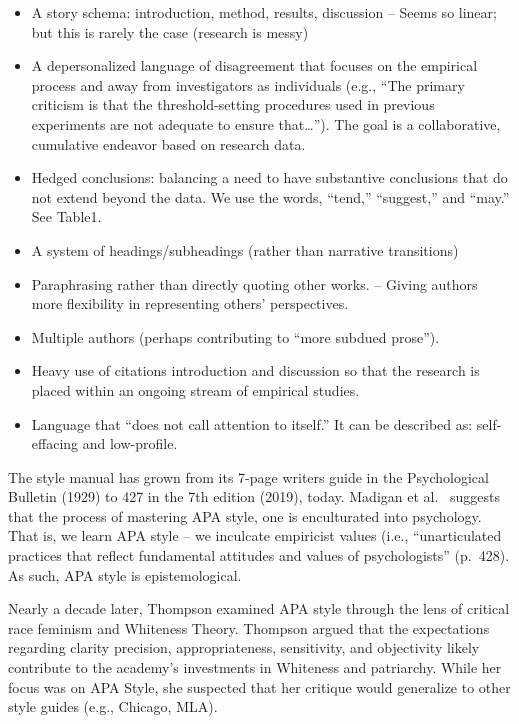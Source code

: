\documentclass[
  english,
]{book}
\providecommand{\tightlist}{%
  \setlength{\itemsep}{0pt}\setlength{\parskip}{0pt}}
\begin{document}
\begin{itemize}
\tightlist
\item
  A story schema: introduction, method, results, discussion
  -- Seems so linear; but this is rarely the case (research is messy)
\item
  A depersonalized language of disagreement that focuses on the empirical process and away from investigators as individuals (e.g., ``The primary criticism is that the threshold-setting procedures used in previous experiments are not adequate to ensure that\ldots{}''). The goal is a collaborative, cumulative endeavor based on research data.
\item
  Hedged conclusions: balancing a need to have substantive conclusions that do not extend beyond the data. We use the words, ``tend,'' ``suggest,'' and ``may.'' See Table1.
\item
  A system of headings/subheadings (rather than narrative transitions)
\item
  Paraphrasing rather than directly quoting other works.
  -- Giving authors more flexibility in representing others' perspectives.
\item
  Multiple authors (perhaps contributing to ``more subdued prose'').
\item
  Heavy use of citations introduction and discussion so that the research is placed within an ongoing stream of empirical studies.
\item
  Language that ``does not call attention to itself.'' It can be described as: self-effacing and low-profile.
\end{itemize}

The style manual has grown from its 7-page writers guide in the Psychological Bulletin (1929) to 427 in the 7th edition (2019), today. Madigan et al.~\citeyearpar{madigan_language_1995} suggests that the process of mastering APA style, one is enculturated into psychology. That is, we learn APA style -- we inculcate empiricist values (i.e., ``unarticulated practices that reflect fundamental attitudes and values of psychologists'' (p.~428). As such, APA style is epistemological.

Nearly a decade later, Thompson \citeyearpar{thompson_gentlemanly_2004} examined APA style through the lens of critical race feminism and Whiteness Theory. Thompson argued that the expectations regarding clarity precision, appropriateness, sensitivity, and objectivity likely contribute to the academy's investments in Whiteness and patriarchy. While her focus was on APA Style, she suspected that her critique would generalize to other style guides (e.g., Chicago, MLA).
\end{document}
